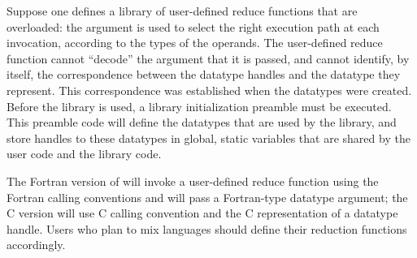 \begin{users}
Suppose one defines a library of user-defined reduce
functions that are overloaded: the  argument is used
to select the right execution path at each invocation, according to
the types of the operands.
The user-defined reduce function cannot ``decode'' the
 argument that it is passed, and cannot identify,
by itself, the correspondence between the datatype handles and the datatype
they represent.  This correspondence was established when the datatypes
were created.  Before the library is used, a library initialization
preamble must be executed.  This preamble code will define the
datatypes that are used by the library, and store handles to these
datatypes in global, static variables that are shared by the user code and the
library code.

The Fortran version of  will invoke a user-defined reduce
function using the Fortran calling conventions and will pass a Fortran-type
datatype argument;  the C version will use C calling convention and the C
representation of a datatype handle.  Users who plan to mix languages should
define their reduction functions accordingly.
\end{users}


